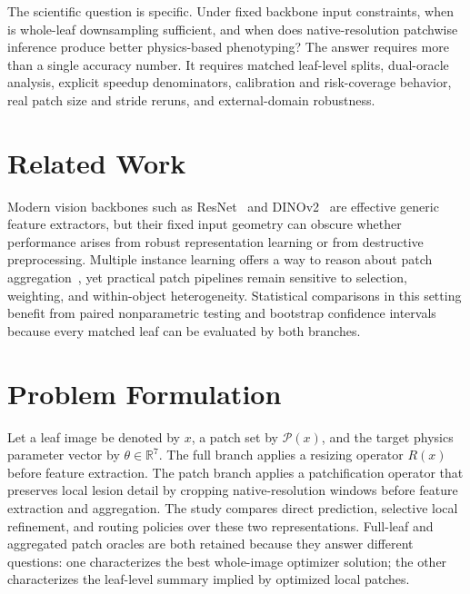 \documentclass[11pt]{article}
\begin{document}
The scientific question is specific. Under fixed backbone input constraints, when is whole-leaf downsampling sufficient, and when does native-resolution patchwise inference produce better physics-based phenotyping? The answer requires more than a single accuracy number. It requires matched leaf-level splits, dual-oracle analysis, explicit speedup denominators, calibration and risk-coverage behavior, real patch size and stride reruns, and external-domain robustness.

\section{Related Work}
Modern vision backbones such as ResNet~\cite{he2016resnet} and DINOv2~\cite{oquab2023dinov2} are effective generic feature extractors, but their fixed input geometry can obscure whether performance arises from robust representation learning or from destructive preprocessing. Multiple instance learning offers a way to reason about patch aggregation~\cite{ilse2018attention}, yet practical patch pipelines remain sensitive to selection, weighting, and within-object heterogeneity. Statistical comparisons in this setting benefit from paired nonparametric testing and bootstrap confidence intervals~\cite{wilcoxon1945,efron1994} because every matched leaf can be evaluated by both branches.

\section{Problem Formulation}
Let a leaf image be denoted by $x$, a patch set by $\mathcal{P}(x)$, and the target physics parameter vector by $\theta \in \mathbb{R}^7$. The full branch applies a resizing operator $R(x)$ before feature extraction. The patch branch applies a patchification operator that preserves local lesion detail by cropping native-resolution windows before feature extraction and aggregation. The study compares direct prediction, selective local refinement, and routing policies over these two representations. Full-leaf and aggregated patch oracles are both retained because they answer different questions: one characterizes the best whole-image optimizer solution; the other characterizes the leaf-level summary implied by optimized local patches.
\end{document}
